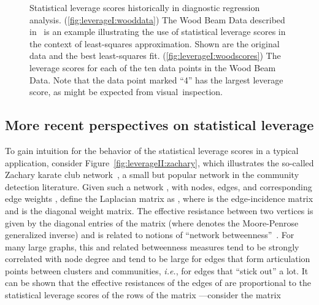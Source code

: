 \documentclass[twoside]{article}
\begin{document}
\begin{figure}
   \begin{center}
 \qquad {} 
\end{center}
\caption{Statistical leverage scores historically in diagnostic regression
analysis.
(\ref{fig:leverageI:wooddata})
The Wood Beam Data described in~\cite{HW78} is an example illustrating the
use of statistical leverage scores in the context of least-squares 
approximation.
Shown are the original data and the best least-squares fit.
(\ref{fig:leverageI:woodscores})
The leverage scores for each of the ten data points in the Wood Beam Data.
Note that the data point marked ``4'' has the largest leverage score, as 
might be expected from visual~inspection.
}
\label{fig:leverageI}
\end{figure}


\subsection{More recent perspectives on statistical leverage} 
\label{sxn:empirical-morerecent}

To gain intuition for the behavior of the statistical leverage scores in a 
typical application, consider Figure~\ref{fig:leverageII:zachary}, which 
illustrates the so-called Zachary karate club 
network~\cite{zachary77karate}, a small but popular network in the community 
detection literature.
Given such a network , with  nodes,  edges, and corresponding 
edge weights , define the  Laplacian matrix as 
, where  is the  edge-incidence matrix and  is 
the  diagonal weight matrix.
The effective resistance between two vertices is given by the diagonal 
entries of the matrix  (where  denotes the 
Moore-Penrose generalized inverse) and is related to notions of ``network 
betweenness''~\cite{newman05_betweenness}.
For many large graphs, this and related betweenness measures tend to be strongly correlated with
node degree and tend to be large for edges that form articulation points
between clusters and communities, \emph{i.e.}, for edges that ``stick out'' 
a lot.
It can be shown that the effective resistances of the edges of  are 
proportional to the statistical leverage scores of the  rows of the 
 matrix ---consider the  matrix
\end{document}
